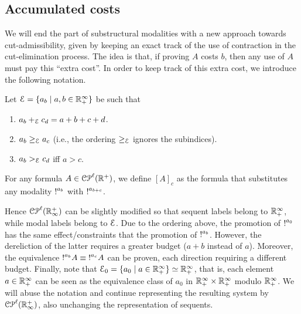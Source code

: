 \subsection{Accumulated costs}
We will end the part of substructural modalities with a new approach towards cut-admissibility, given by keeping an exact track of the use of contraction in the cut-elimination process.  
The idea is that, if proving $A$ costs $b$, then any use of $A$  
must pay this ``extra cost''. In order to keep track of this extra cost, we introduce the following notation.

\begin{definition}
Let $\mathcal{E}=\{a_b\mid a,b\in \mathbb{R}_+^\infty\}$ be such that 
\begin{enumerate}
\item $a_b+_{\mathcal{E}} c_d=a+b+c+d$.
\item $a_b \geq_{\mathcal{E}} a_c$ (i.e., the ordering $\geq_{\mathcal{E}}$ ignores the subindices).
\item $a_b >_{\mathcal{E}} c_d$ iff $a>c$.
\end{enumerate}
For any formula $A\in\mathcal{CP}^\ell(\mathbb{R}^{+})$, we define $[A]_c$ as the formula that substitutes any 
modality $\hbox{$\mathop{!}^{a_b}$}{}$ with $\hbox{$\mathop{!}^{a_{b+c}}$}$.
\end{definition}
Hence $\mathcal{CP}^\ell(\mathbb{R}^{+}_\infty)$ can be slightly modified so that sequent labels belong to  $\mathbb{R}_+^\infty$, while modal labels belong to $\mathcal{E}$. Due to the ordering above, the promotion of $\hbox{$\mathop{!}^{a_0}$}$ 
has the same effect/constraints that the promotion of $\hbox{$\mathop{!}^{a_b}$}$. However, the dereliction of the latter requires a greater budget ($a+b$ instead of $a$). Moreover, the equivalence $\hbox{$\mathop{!}^{a_b}$}A \equiv \hbox{$\mathop{!}^{a_c}$}A$ can be proven, each direction requiring a different budget.
Finally, note that $\mathcal{E}_0=\{a_0\mid a\in \mathbb{R}_+^\infty\}\simeq \mathbb{R}_+^\infty$, that is, each element $a\in\mathbb{R}_+^\infty$ can be seen as the equivalence class of $a_0$ in $\mathbb{R}_+^\infty\times \mathbb{R}_+^\infty$ modulo $\mathbb{R}_+^\infty$.
We will abuse the notation and continue representing the resulting system by $\mathcal{CP}^\ell(\mathbb{R}^{+}_\infty)$, also unchanging the representation of sequents. 


